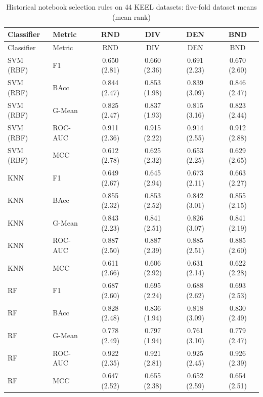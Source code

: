 \begingroup\small\setlength{\tabcolsep}{3pt}
\begin{longtable}{@{}llcccc@{}}
\caption{Historical notebook selection rules on 44 KEEL datasets: five-fold dataset means (mean rank)}\label{tab:3}\\
\toprule
Classifier & Metric & RND & DIV & DEN & BND \\
\midrule
\endfirsthead
\toprule
Classifier & Metric & RND & DIV & DEN & BND \\
\midrule
\endhead
\bottomrule
\endlastfoot
SVM (RBF) & F1 & 0.650 (2.81) & 0.660 (2.36) & 0.691 (2.23) & 0.670 (2.60) \\
SVM (RBF) & BAcc & 0.844 (2.47) & 0.853 (1.98) & 0.839 (3.09) & 0.846 (2.47) \\
SVM (RBF) & G-Mean & 0.825 (2.47) & 0.837 (1.93) & 0.815 (3.16) & 0.823 (2.44) \\
SVM (RBF) & ROC-AUC & 0.911 (2.36) & 0.915 (2.22) & 0.914 (2.55) & 0.912 (2.88) \\
SVM (RBF) & MCC & 0.612 (2.78) & 0.625 (2.32) & 0.653 (2.25) & 0.629 (2.65) \\
KNN & F1 & 0.649 (2.67) & 0.645 (2.94) & 0.673 (2.11) & 0.663 (2.27) \\
KNN & BAcc & 0.855 (2.32) & 0.853 (2.52) & 0.842 (3.01) & 0.855 (2.15) \\
KNN & G-Mean & 0.843 (2.23) & 0.841 (2.51) & 0.826 (3.07) & 0.841 (2.19) \\
KNN & ROC-AUC & 0.887 (2.50) & 0.887 (2.39) & 0.885 (2.51) & 0.885 (2.60) \\
KNN & MCC & 0.611 (2.66) & 0.606 (2.92) & 0.631 (2.14) & 0.622 (2.28) \\
RF & F1 & 0.687 (2.60) & 0.695 (2.24) & 0.688 (2.62) & 0.693 (2.53) \\
RF & BAcc & 0.828 (2.48) & 0.836 (1.94) & 0.818 (3.09) & 0.830 (2.49) \\
RF & G-Mean & 0.778 (2.49) & 0.797 (1.94) & 0.761 (3.10) & 0.779 (2.47) \\
RF & ROC-AUC & 0.922 (2.35) & 0.921 (2.81) & 0.925 (2.45) & 0.926 (2.39) \\
RF & MCC & 0.647 (2.52) & 0.655 (2.38) & 0.652 (2.59) & 0.654 (2.51) \\
\end{longtable}
\endgroup
